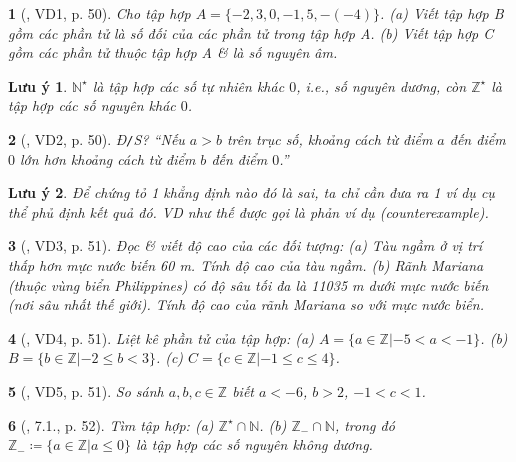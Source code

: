\documentclass{article}
\newtheorem{baitoan}{}
\newtheorem{luuy}{Lưu ý}
\begin{document}
\begin{baitoan}[\cite{Binh_boi_duong_Toan_6_tap_1}, VD1, p. 50]
	Cho tập hợp $A = \{-2,3,0,-1,5,-(-4)\}$. (a) Viết tập hợp B gồm các phần tử là số đối của các phần tử trong tập hợp A. (b) Viết tập hợp C gồm các phần tử thuộc tập hợp A \& là số nguyên âm.
\end{baitoan}

\begin{luuy}
	$\mathbb{N}^\star$ là tập hợp các số tự nhiên khác $0$, i.e., số nguyên dương, còn $\mathbb{Z}^\star$ là tập hợp các số nguyên khác $0$.
\end{luuy}

\begin{baitoan}[\cite{Binh_boi_duong_Toan_6_tap_1}, VD2, p. 50]
	{\rm Đ{\tt/}S?} ``Nếu $a > b$ trên trục số, khoảng cách từ điểm $a$ đến điểm $0$ lớn hơn khoảng cách từ điểm $b$ đến điểm $0$.''
\end{baitoan}

\begin{luuy}
	Để chứng tỏ 1 khẳng định nào đó là sai, ta chỉ cần đưa ra 1 ví dụ cụ thể phủ định kết quả đó. VD như thế được gọi là {\rm phản ví dụ (counterexample)}.
\end{luuy}

\begin{baitoan}[\cite{Binh_boi_duong_Toan_6_tap_1}, VD3, p. 51]
	Đọc \& viết độ cao của các đối tượng: (a) Tàu ngầm ở vị trí thấp hơn mực nước biến {\rm60 m}. Tính độ cao của tàu ngầm. (b) Rãnh Mariana (thuộc vùng biển Philippines) có độ sâu tối đa là {\rm11035 m} dưới mực nước biến (nơi sâu nhất thế giới). Tính độ cao của rãnh Mariana so với mực nước biển.
\end{baitoan}

\begin{baitoan}[\cite{Binh_boi_duong_Toan_6_tap_1}, VD4, p. 51]
	Liệt kê phần tử của tập hợp: (a) $A = \{a\in\mathbb{Z}|-5 < a < -1\}$. (b) $B = \{b\in\mathbb{Z}|-2\le b < 3\}$. (c) $C = \{c\in\mathbb{Z}|-1\le c\le4\}$.
\end{baitoan}

\begin{baitoan}[\cite{Binh_boi_duong_Toan_6_tap_1}, VD5, p. 51]
	So sánh $a,b,c\in\mathbb{Z}$ biết $a < -6$, $b > 2$, $-1 < c < 1$.
\end{baitoan}

\begin{baitoan}[\cite{Binh_boi_duong_Toan_6_tap_1}, 7.1., p. 52]
	Tìm tập hợp: (a) $\mathbb{Z}^\star\cap\mathbb{N}$. (b) $\mathbb{Z}_-\cap\mathbb{N}$, trong đó $\mathbb{Z}_-\coloneqq\{a\in\mathbb{Z}|a\le0\}$ là tập hợp các số nguyên không dương.
\end{baitoan}
\end{document}
